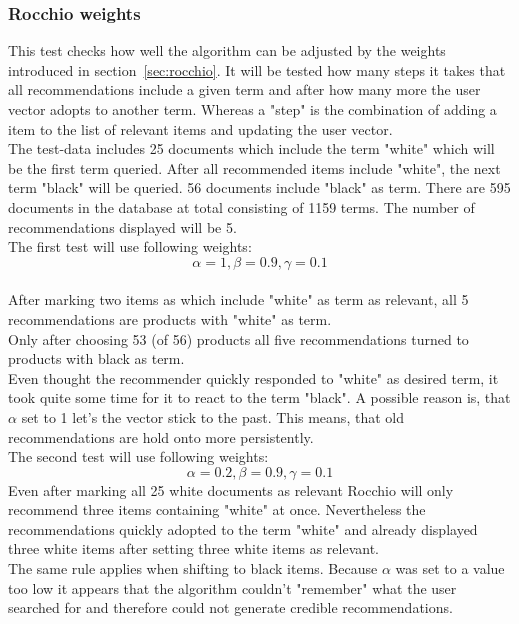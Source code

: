 \subsubsection{Rocchio weights}
\label{sec:rocchio-weights}
This test checks how well the algorithm can be adjusted by the weights introduced in section~\ref{sec:rocchio}.
It will be tested how many steps it takes that all recommendations include a given term and after how many more the user vector adopts to another term.
Whereas a "step" is the combination of adding a item to the list of relevant items and updating the user vector.
\\
The test-data includes 25 documents which include the term "white" which will be the first term queried.
After all recommended items include "white", the next term "black" will be queried.
56 documents include "black" as term.
There are 595 documents in the database at total consisting of 1159 terms.
The number of recommendations displayed will be 5.
\\

\noindent
The first test will use following weights:
\\
$$\alpha = 1, \beta = 0.9, \gamma = 0.1$$
\\
After marking two items as which include "white" as term as relevant, all 5 recommendations are products with "white" as term.
\\
Only after choosing 53 (of 56) products all five recommendations turned to products with black as term.
\\
Even thought the recommender quickly responded to "white" as desired term, it took quite some time for it to react to the term "black".
A possible reason is, that $\alpha$ set to 1 let's the vector stick to the past.
This means, that old recommendations are hold onto more persistently.
\\

\noindent
The second test will use following weights:
\\
$$\alpha = 0.2, \beta = 0.9, \gamma = 0.1$$
Even after marking all 25 white documents as relevant Rocchio will only recommend three items containing "white" at once.
Nevertheless the recommendations quickly adopted to the term "white" and already displayed three white items after setting three white items as relevant.
\\
The same rule applies when shifting to black items.
Because $\alpha$ was set to a value too low it appears that the algorithm couldn't "remember" what the user searched for and therefore could not generate credible recommendations.
\\

